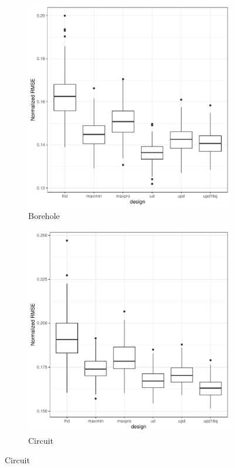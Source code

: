 \documentclass [PhD] {package/uclathes}
\begin{document}
\begin{figure}%
\begin{adjustwidth}{-2cm}{-2cm}
\captionsetup[subfigure]{labelformat=empty}
\centering
\begin{subfigure}[b]{0.35\textwidth}
\centering
\caption{Borehole}
\includegraphics[width=\textwidth]{chapters/EGO/pdfs/Borehole_128x31}
\end{subfigure}
\begin{subfigure}[b]{0.35\textwidth}
\centering
\caption{Circuit}
\includegraphics[width=\textwidth]{chapters/EGO/pdfs/Circuit_128x31}

\end{subfigure}
\end{adjustwidth}
\end{figure}
\end{document}
